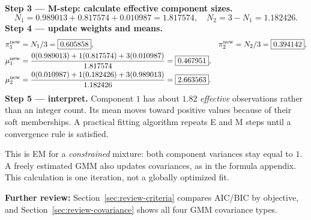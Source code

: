 \textbf{Step 3 --- M-step: calculate effective component sizes.}
\[
N_1=0.989013+0.817574+0.010987=1.817574,\quad N_2=3-N_1=1.182426.
\]
\textbf{Step 4 --- update weights and means.}
\[
\begin{aligned}
\pi_1^{\rm new}&=N_1/3=\boxed{0.605858}, &
\pi_2^{\rm new}&=N_2/3=\boxed{0.394142},\\
\mu_1^{\rm new}&=\frac{0(0.989013)+1(0.817574)+3(0.010987)}{1.817574}
=\boxed{0.467951},\\
\mu_2^{\rm new}&=\frac{0(0.010987)+1(0.182426)+3(0.989013)}{1.182426}
=\boxed{2.663563}.
\end{aligned}
\]
\textbf{Step 5 --- interpret.} Component $1$ has about $1.82$ \emph{effective} observations rather than an integer count. Its mean moves toward positive values because of their soft memberships. A practical fitting algorithm repeats E and M steps until a convergence rule is satisfied.
\begin{important}
This is EM for a \emph{constrained} mixture: both component variances stay equal to $1$. A freely estimated GMM also updates covariances, as in the formula appendix. This calculation is one iteration, not a globally optimized fit.
\end{important}

\par\textbf{Further review:} Section~\ref{sec:review-criteria} compares AIC/BIC by objective, and Section~\ref{sec:review-covariance} shows all four GMM covariance types.
